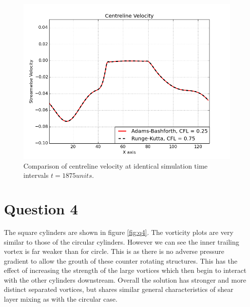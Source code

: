 \documentclass[10pt, a4paper]{article}
\begin{document}
\begin{figure}[!htb]
  \centering
	  \includegraphics[width=.45\linewidth, clip=true, trim=0cm 0cm 0cm 0cm]{velocity}
  \caption{Comparison of centreline velocity at identical simulation time intervals $t = 1875 units$.}
  \label{fig:comp_rkadm}
\end{figure}%

\newpage
\section*{Question 4}

The square cylinders are shown in figure \ref{fig:q4}. The vorticity plots are very similar to those of the circular cylinders. However we can see the inner trailing vortex is far weaker than for circle. This is as there is no adverse pressure gradient to allow the grouth of these counter rotating structures. This has the effect of increasing the strength of the large vortices which then begin to interact with the other cylinders downstream. Overall the solution has stronger and more distinct separated vortices, but shares similar general characteristics of shear layer mixing as with the circular case.
\end{document}
